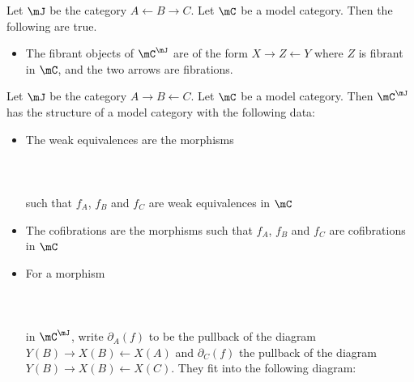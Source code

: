 \documentclass[a4paper]{article}
\begin{document}
\begin{prp}{}{} Let $\mJ$ be the category $A\leftarrow B\rightarrow C$. Let $\mC$ be a model category. Then the following are true. 
\begin{itemize}
\item The fibrant objects of $\mC^\mJ$ are of the form $X\rightarrow Z\leftarrow Y$ where $Z$ is fibrant in $\mC$, and the two arrows are fibrations. 
\end{itemize}
\end{prp}

\begin{prp}{}{} Let $\mJ$ be the category $A\rightarrow B\leftarrow C$. Let $\mC$ be a model category. Then $\mC^\mJ$ has the structure of a model category with the following data: 
\begin{itemize}
\item The weak equivalences are the morphisms \\~\\
\\~\\
such that $f_A$, $f_B$ and $f_C$ are weak equivalences in $\mC$
\item The cofibrations are the morphisms such that $f_A$, $f_B$ and $f_C$ are cofibrations in $\mC$
\item For a morphism \\~\\
\\~\\ in $\mC^\mJ$, write $\partial_A(f)$ to be the pullback of the diagram $Y(B)\rightarrow X(B)\leftarrow X(A)$ and $\partial_C(f)$ the pullback of the diagram $Y(B)\rightarrow X(B)\leftarrow X(C)$. They fit into the following diagram: \\~\\

\end{itemize}
\end{prp}
\end{document}
